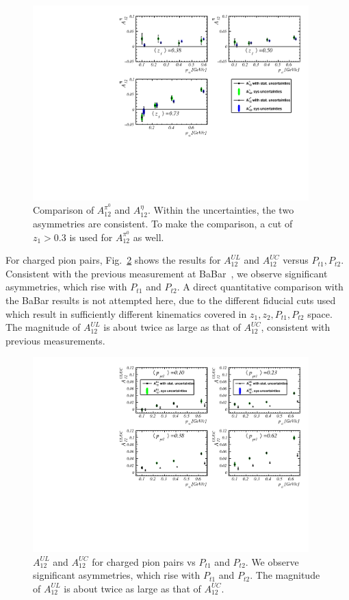 \documentclass[aps,prX,preprint,groupedaddress,linenumbers]{revtex4-1}
\begin{document}
\begin{figure}
\includegraphics[width=0.95\textwidth]{figs_paper/etaPi0VsZPt.pdf}
\caption{Comparison of $A^{\pi^0}_{12}$ and $A^{\eta}_{12}$. Within the uncertainties, the two asymmetries are consistent. To make the comparison, a cut of $z_1>0.3$ is used for $A^{\pi^0}_{12}$ as well.\label{fig:resEtaPi0ZPt}}
\end{figure}

For charged pion pairs, Fig.~\ref{fig:resUlUcPt1Pt2} shows the results for $A^{UL}_{12}$ and $A^{UC}_{12}$ versus $P_{t1},P_{t2}$. Consistent with the previous measurement at BaBar~\cite{BabarCharged}, we observe significant asymmetries, which rise with $P_{t1}$ and $P_{t2}$. A direct quantitative comparison with the BaBar results is not attempted here, due to the different fiducial cuts used which result in sufficiently different kinematics covered in $z_1,z_2,P_{t1},P_{t2}$ space.
The magnitude of $A^{UL}_{12}$ is about twice as large as that of $A^{UC}_{12}$, consistent with previous measurements.

\begin{figure}
\includegraphics[width=0.95\textwidth]{figs_paper/ulUcPt1Pt2.pdf}
\caption{$A^{UL}_{12}$ and $A^{UC}_{12}$ for charged pion pairs vs $P_{t1}$ and $P_{t2}$. We observe significant asymmetries, which rise with $P_{t1}$ and $P_{t2}$. The magnitude of $A^{UL}_{12}$ is about twice as large as that of $A^{UC}_{12}$.\label{fig:resUlUcPt1Pt2}}	
\end{figure}
\end{document}
